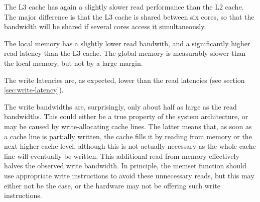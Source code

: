 The L3 cache has again a slightly slower read performance than the L2
cache. The major difference is that the L3 cache is shared between six
cores, so that the bandwidth will be shared if several cores access it
simultaneously.

The local memory has a slightly lower read bandwith, and a
significantly higher read latency than the L3 cache. The global memory
is measurably slower than the local memory, but not by a large margin.

The write latencies are, as expected, lower than the read latencies
(see section \ref{sec:write-latency}).

The write bandwidths are, surprisingly, only about half as large as
the read bandwidths. This could either be a true property of the
system architecture, or may be caused by write-allocating cache lines.
The latter means that, as soon as a cache line is partially written,
the cache fills it by reading from memory or the next higher cache
level, although this is not actually necessary as the whole cache line
will eventually be written. This additional read from memory
effectively halves the observed write bandwidth. In principle, the
memset function should use appropriate write instructions to avoid
these unnecessary reads, but this may either not be the case, or the
hardware may not be offering such write instructions.



\begin{thebibliography}{9}
  
  
  
  
\end{thebibliography}



